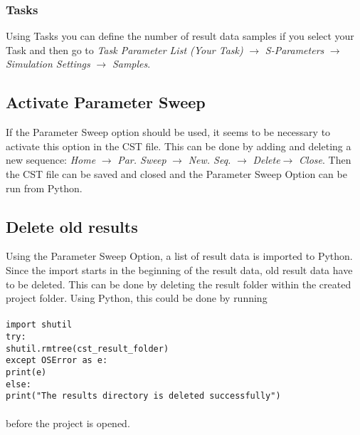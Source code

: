 \documentclass[12pt,accentcolor=tud2b, colorback, openany]{tudreport}
\begin{document}
	\subsubsection{Tasks} 
	Using Tasks you can define the number of result data samples if you select your Task and then go to \textit{Task Parameter List (Your Task)} $\rightarrow$ \textit{S-Parameters} $\rightarrow$ \textit{Simulation Settings} $\rightarrow$ \textit{Samples}. 
	
	\subsection{Activate Parameter Sweep}
	If the Parameter Sweep option should be used, it seems to be necessary to activate this option in the CST file. This can be done by adding and deleting a new sequence: \textit{Home} $\rightarrow$ \textit{Par. Sweep} $\rightarrow$ \textit{New. Seq.} $\rightarrow$ \textit{Delete}$\rightarrow$ \textit{Close}. Then the CST file can be saved and closed and the Parameter Sweep Option can be run from Python.
	
	\subsection{Delete old results}
	Using the Parameter Sweep Option, a list of result data is imported to Python. Since the import starts in the beginning of the result data, old result data have to be deleted. This can be done by deleting the result folder within the created project folder. Using Python, this could be done by running\\
	\\
	\texttt{import shutil}\\
	\texttt{try:}\\
	\hspace*{0.3cm}\texttt{shutil.rmtree(cst\_result\_folder)}\\
	\texttt{except OSError as e:}\\
	\hspace*{0.3cm}\texttt{print(e)}\\
	\texttt{else:}\\
	\hspace*{0.3cm}\texttt{print("The results directory is deleted successfully")}\\
	\\
	before the project is opened.
	
\end{document}
